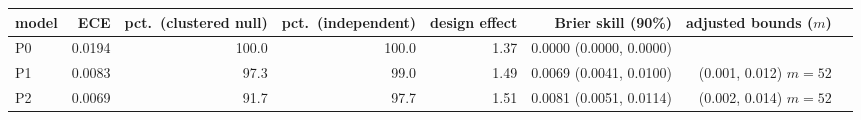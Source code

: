 \begin{tabular}{lrrrrrrr}
\toprule
model & ECE & pct.\ (clustered null) & pct.\ (independent) & design effect & Brier skill (90\%) & adjusted bounds ($m$) \\
\midrule
P0 & 0.0194 & 100.0 & 100.0 & 1.37 & 0.0000 (0.0000, 0.0000) &  \\
P1 & 0.0083 & 97.3 & 99.0 & 1.49 & 0.0069 (0.0041, 0.0100) & (0.001, 0.012) $m=52$ \\
P2 & 0.0069 & 91.7 & 97.7 & 1.51 & 0.0081 (0.0051, 0.0114) & (0.002, 0.014) $m=52$ \\
\bottomrule
\end{tabular}
